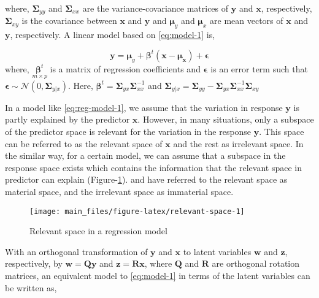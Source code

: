 \documentclass[12pt,3p,authoryear]{elsarticle}
\begin{document}
where, \(\boldsymbol{\Sigma}_{yy}\) and \(\boldsymbol{\Sigma}_{xx}\) are
the variance-covariance matrices of \(\mathbf{y}\) and \(\mathbf{x}\),
respectively, \(\boldsymbol{\Sigma}_{xy}\) is the covariance between
\(\mathbf{x}\) and \(\mathbf{y}\) and \(\boldsymbol{\mu}_y\) and
\(\boldsymbol{\mu}_x\) are mean vectors of \(\mathbf{x}\) and
\(\mathbf{y}\), respectively. A linear model based on \eqref{eq:model-1}
is,

\begin{equation}
\mathbf{y} = \boldsymbol{\mu}_y + 
  \boldsymbol{\beta}^t(\mathbf{x} - \boldsymbol{\mu_x}) + 
  \boldsymbol{\epsilon}
\label{eq:reg-model-1}
\end{equation} where, \(\underset{m\times p}{\boldsymbol{\beta}^t}\) is
a matrix of regression coefficients and \(\boldsymbol{\epsilon}\) is an
error term such that
\(\boldsymbol{\epsilon} \sim \mathcal{N}(0, \boldsymbol{\Sigma}_{y|x})\).
Here,
\(\boldsymbol{\beta}^t = \mathbold{\Sigma}_{yx}\mathbold{\Sigma}_{xx}^{-1}\)
and
\(\boldsymbol{\Sigma}_{y|x} = \boldsymbol{\Sigma}_{yy} - \boldsymbol{\Sigma}_{yx}\boldsymbol{\Sigma}_{xx}^{-1}\boldsymbol{\Sigma}_{xy}\)

In a model like \eqref{eq:reg-model-1}, we assume that the variation in
response \(\mathbf{y}\) is partly explained by the predictor
\(\mathbf{x}\). However, in many situations, only a subspace of the
predictor space is relevant for the variation in the response
\(\mathbf{y}\). This space can be referred to as the relevant space of
\(\mathbf{x}\) and the rest as irrelevant space. In the similar way, for
a certain model, we can assume that a subspace in the response space
exists which contains the information that the relevant space in
predictor can explain (Figure-\ref{fig:relevant-space}).
\citet{cook2010envelope} and \citet{cook2015simultaneous} have referred
to the relevant space as material space, and the irrelevant space as
immaterial space.

\begin{figure}

{\centering \texttt{[image: main\_files/figure-latex/relevant-space-1]} 

}

\caption{Relevant space in a regression model}\label{fig:relevant-space}
\end{figure}

With an orthogonal transformation of \(\mathbf{y}\) and \(\mathbf{x}\)
to latent variables \(\mathbf{w}\) and \(\mathbf{z}\), respectively, by
\(\mathbf{w=Qy}\) and \(\mathbf{z = Rx}\), where \(\mathbf{Q}\) and
\(\mathbf{R}\) are orthogonal rotation matrices, an equivalent model to
\eqref{eq:model-1} in terms of the latent variables can be written as,
\end{document}

